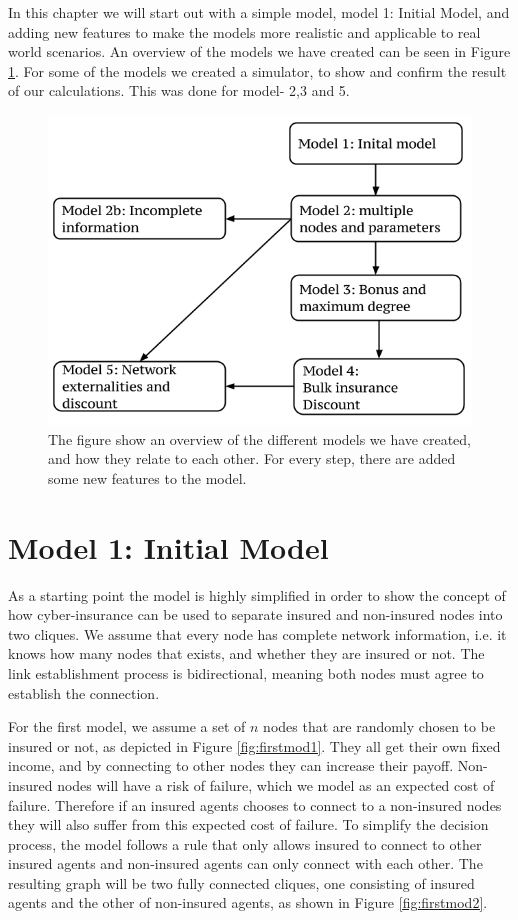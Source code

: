 In this chapter we will start out with a simple model, model 1: Initial Model, and adding new features to make the models more realistic and applicable to real world scenarios. An overview of the models we have created can be seen in Figure \ref{fig:Overview-of-models}. For some of the models we created a simulator, to show and confirm the result of our calculations. This was done for model- 2,3 and 5. 
\begin{figure}[h]
\centering
  \includegraphics[width=0.9\linewidth]{../Figures/modeloverview.png}
  \caption{\label{fig:Overview-of-models} The figure show an overview of the different models we have created, and how they relate to each other. For every step, there are added some new features to the model.}

\end{figure}

\section{Model 1: Initial Model \label{section:verysimplemodel}}

As a starting point the model is highly simplified in order to show the concept of how cyber-insurance can be used to separate insured and non-insured nodes into two cliques. We assume that every node has complete network information, i.e. it knows how many nodes that exists, and whether they are insured or not. The link establishment process is bidirectional, meaning both nodes must agree to establish the connection.

For the first model, we assume a set of $n$ nodes that are randomly chosen to be insured or not, as depicted in Figure \ref{fig:firstmod1}. They all get their own fixed income, and by connecting to other nodes they can increase their payoff. Non-insured nodes will have a risk of failure, which we model as an expected cost of failure. Therefore if an insured agents chooses to connect to a non-insured nodes they will also suffer from this expected cost of failure. To simplify the decision process, the model follows a rule that only allows insured to connect to other insured agents and non-insured agents can only connect with each other. The resulting graph will be two fully connected cliques, one consisting of insured agents and the other of non-insured agents, as shown in Figure  \ref{fig:firstmod2}. 

